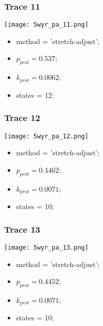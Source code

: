 \subsubsection{Trace 11}
\begin{minipage}[c]{0.7\textwidth}
    \texttt{[image: 5wyr\_pa\_11.png]}
\end{minipage}
\hfill
\begin{minipage}[c]{0.45\textwidth}
    \begin{itemize}
        \item method = 'stretch-adjust';
        \item $p_{prot}=0.537$;
        \item $k_{prot}=0.0062$;
        \item states = 12;
    \end{itemize}
\end{minipage}

\subsubsection{Trace 12}
\begin{minipage}[c]{0.7\textwidth}
    \texttt{[image: 5wyr\_pa\_12.png]}
\end{minipage}
\hfill
\begin{minipage}[c]{0.45\textwidth}
    \begin{itemize}
        \item method = 'stretch-adjust';
        \item $p_{prot}=0.4462$;
        \item $k_{prot}=0.0071$;
        \item states = 10;
    \end{itemize}
\end{minipage}

\subsubsection{Trace 13}
\begin{minipage}[c]{0.7\textwidth}
    \texttt{[image: 5wyr\_pa\_13.png]}
\end{minipage}
\hfill
\begin{minipage}[c]{0.45\textwidth}
    \begin{itemize}
        \item method = 'stretch-adjust';
        \item $p_{prot}=0.4452$;
        \item $k_{prot}=0.0071$;
        \item states = 10;
    \end{itemize}
\end{minipage}

